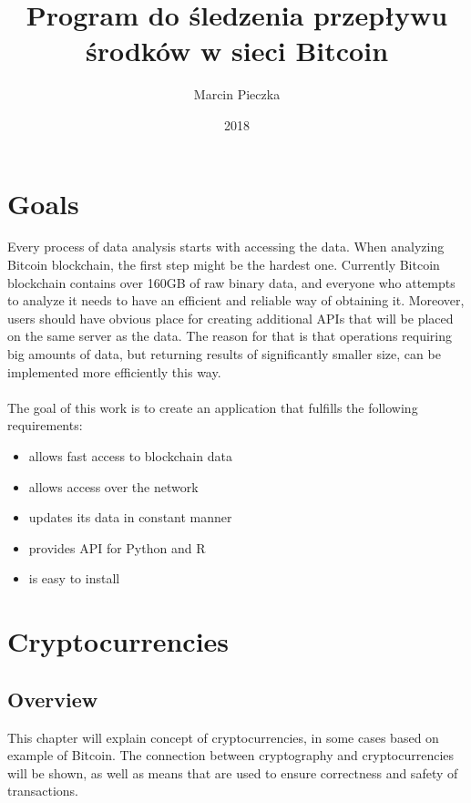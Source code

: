 \documentclass[12pt, en, eng, oneside]{mgr}
\begin{document}
\title{Program do śledzenia przepływu środków w sieci Bitcoin}
\date{2018}
\author{Marcin Pieczka}
\maketitle

\tableofcontents

\chapter{Goals}

Every process of data analysis starts with accessing the data. When analyzing Bitcoin blockchain, the first step might be the hardest one. Currently Bitcoin blockchain contains over 160GB of raw binary data, and everyone who attempts to analyze it needs to have an efficient and reliable way of obtaining it. Moreover, users should have obvious place for creating additional APIs that will be placed on the same server as the data. The reason for that is that operations requiring big amounts of data, but returning results of significantly smaller size, can be implemented more efficiently this way.
\\
\\
The goal of this work is to create an application that fulfills the following requirements: 
\begin{itemize}

\item
allows fast access to blockchain data
\item
allows access over the network
\item
updates its data in constant manner
\item
provides API for Python and R
\item
is easy to install

\end{itemize}

\chapter{Cryptocurrencies}

\section{Overview}
This chapter will explain concept of cryptocurrencies, in some cases based on example of Bitcoin. The connection between cryptography and cryptocurrencies will be shown, as well as means that are used to ensure correctness and safety of transactions.
\end{document}
